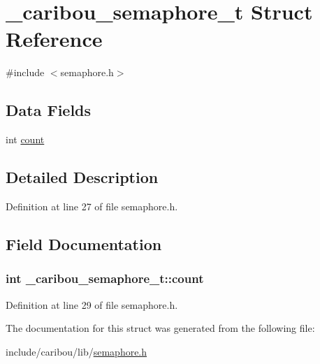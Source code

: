 \hypertarget{struct__caribou__semaphore__t}{\section{\-\_\-caribou\-\_\-semaphore\-\_\-t Struct Reference}
\label{struct__caribou__semaphore__t}
}


{\ttfamily \#include $<$semaphore.\-h$>$}

\subsection*{Data Fields}
\begin{DoxyCompactItemize}
\item 
int \hyperlink{struct__caribou__semaphore__t_ac20e6280acd9c0aadb09d81b55c6eb22}{count}
\end{DoxyCompactItemize}


\subsection{Detailed Description}


Definition at line 27 of file semaphore.\-h.



\subsection{Field Documentation}
\hypertarget{struct__caribou__semaphore__t_ac20e6280acd9c0aadb09d81b55c6eb22}{
\subsubsection[{count}]{\setlength{\rightskip}{0pt plus 5cm}int \-\_\-caribou\-\_\-semaphore\-\_\-t\-::count}}\label{struct__caribou__semaphore__t_ac20e6280acd9c0aadb09d81b55c6eb22}


Definition at line 29 of file semaphore.\-h.



The documentation for this struct was generated from the following file\-:\begin{DoxyCompactItemize}
\item 
include/caribou/lib/\hyperlink{semaphore_8h}{semaphore.\-h}\end{DoxyCompactItemize}
